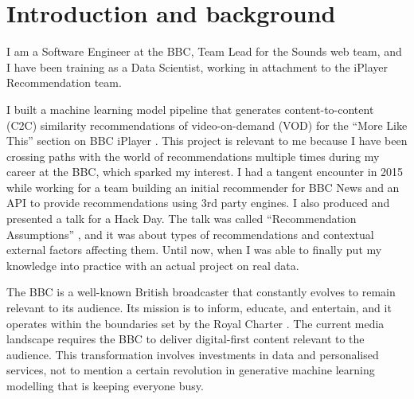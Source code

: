 
\section{Introduction and background}

I am a Software Engineer at the BBC, Team Lead for the Sounds web team, and I have been training as a Data Scientist,
working in attachment to the iPlayer Recommendation team.

I built a machine learning model pipeline that generates content-to-content (C2C) similarity recommendations
of video-on-demand (VOD) for the ``More Like This'' section on BBC iPlayer \cite{BBC:MoreLikeBluey}.
This project is relevant to me because I have been crossing paths with the world of recommendations
multiple times during my career at the BBC, which sparked my interest.
I had a tangent encounter in 2015 while working for a team building
an initial recommender for BBC News and an API to provide recommendations using 3rd party engines.
I also produced and presented a talk for a Hack Day.
The talk was called ``Recommendation Assumptions'' \cite{RecsAssumptions},
and it was about types of recommendations and contextual external factors affecting them.
Until now, when I was able to finally put my knowledge into practice
with an actual project on real data.

The BBC is a well-known British broadcaster that constantly evolves to remain relevant to its audience.
Its mission is to inform, educate, and entertain, and it operates within the boundaries set by the Royal Charter \cite{BBC:RoyalCharter}.
The current media landscape requires the BBC to deliver digital-first content relevant to the audience.
This transformation involves investments in data and personalised services,
not to mention a certain revolution in generative machine learning modelling that is keeping everyone busy.
